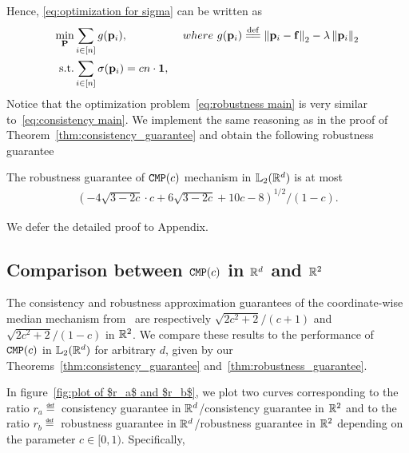 Hence, \eqref{eq:optimization for sigma} can be written as
\begin{align}
 \label{eq:robustness main}
\min\limits_{\locs}& \sum_{i\in[n]} g(\loci), &\ %
 where~ g(\loci)\eqdef\qnorm[2]{\loci-\facility}-\lambda\qnorm[2]{\loci} \nonumber\\
 \text{s.t.}&  \sum_{i\in [n]}\sigma(\loci) = cn\cdot\vect{1}, &
\end{align}
Notice that the optimization problem~\eqref{eq:robustness main} is very similar to~\eqref{eq:consistency main}. We implement the same reasoning as in the proof of Theorem~\eqref{thm:consistency_guarantee} and obtain the following robustness guarantee 
\begin{theorem}
    \label{thm:robustness_guarantee}
    The robustness guarantee of $\CMP(c)$ mechanism in $\lqnorm[2](\R^d)$ is at most
    \begin{align*}
    \left( -4\sqrt{3-2c}\cdot c + 6\sqrt{3-2c} + 10c - 8 \right)^{1/2} / (1-c).
    \end{align*}
\end{theorem}

 We defer the detailed proof to Appendix.


\subsection*{Comparison between $\CMP(c)$ in $\reals^d$ and $\reals^2$}
The consistency and robustness approximation guarantees of the coordinate-wise median mechanism from~\cite{AgrawalBGTX22} are respectively $\sqrt{2c^2+2}/(c+1)$ and $\sqrt{2c^2+2}/(1-c)$ in $\reals^2$. We compare these results to the performance of $\CMP(c)$ in $\lqnorm[2](\reals^d)$ for arbitrary $d$, given by our Theorems~\ref{thm:consistency_guarantee} and~\ref{thm:robustness_guarantee}.

In figure~\ref{fig:plot of $r_a$ and $r_b$}, we plot two curves corresponding to the ratio $r_a\eqdef$ consistency guarantee in $\reals^d$/consistency guarantee in $\reals^2$ and to the ratio $r_b\eqdef$ robustness guarantee in $\reals^d$/robustness guarantee in $\reals^2$ depending on the parameter $c\in[0,1)$. Specifically,

